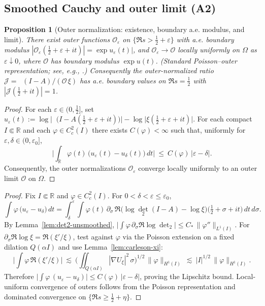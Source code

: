\documentclass[11pt]{article}
\newtheorem{proposition}[theorem]{Proposition}
\theoremstyle{definition}
\theoremstyle{remark}
\newcommand{\R}{\mathbb{R}}
\DeclareMathOperator{\dettwo}{det_2}
\begin{document}
\subsection*{Smoothed Cauchy and outer limit (A2)}
\begin{proposition}[Outer normalization: existence, boundary a.e. modulus, and limit]\label{prop:outer-central}
There exist outer functions \(\mathcal O_\varepsilon\) on \(\{\Re s>\tfrac12+\varepsilon\}\) with a.e. boundary modulus \(|\mathcal O_\varepsilon(\tfrac12+\varepsilon+it)|=\exp u_\varepsilon(t)|\), and \(\mathcal O_\varepsilon\to\mathcal O\) locally uniformly on \(\Omega\) as \(\varepsilon\downarrow 0\), where \(\mathcal O\) has boundary modulus \(\exp u(t)\). (Standard Poisson–outer representation; see, e.g., \cite{Garnett,RosenblumRovnyak}.) Consequently the outer-normalized ratio \(\mathcal J=\dettwo(I-A)/(\mathcal O\,\xi)\) has a.e. boundary values on \(\Re s=\tfrac12\) with \(|\mathcal J(\tfrac12+it)|=1\).
\end{proposition}
\begin{proof}
For each $\varepsilon\in(0,\tfrac12]$, set $u_\varepsilon(t):=\log\Big|\dettwo\!\big(I\! -\!A(\tfrac12\!+\!\varepsilon\!+\!it)\big)\Big|\! -\!\log\big|\xi(\tfrac12\!+\!\varepsilon\!+\!it)\big|$. For each compact $I\Subset\R$ and each $\varphi\in C_c^2(I)$ there exists $C(\varphi)<\infty$ such that, uniformly for $\varepsilon,\delta\in(0,\varepsilon_0]$,
\[\Big|\int_{\R} \varphi(t)\,\big(u_\varepsilon(t)-u_\delta(t)\big)\,dt\Big|\ \le\ C(\varphi)\,|\varepsilon-\delta|.\]
Consequently, the outer normalizations $\mathcal O_\varepsilon$ converge locally uniformly to an outer limit $\mathcal O$ on $\Omega$.
\end{proof}
\begin{proof}
Fix $I\Subset\R$ and $\varphi\in C_c^2(I)$. For $0<\delta<\varepsilon\le\varepsilon_0$,
\[\int \varphi\,\big(u_\varepsilon-u_\delta\big)\,dt = \int_\delta^{\varepsilon}\!\int \varphi(t)\,\partial_\sigma\,\Re\Big(\log\det_2(I-A)-\log\xi\Big)\big(\tfrac12+\sigma+it\big)\,dt\,d\sigma.\]
By Lemma~\ref{lem:det2-unsmoothed}, $\big|\int \varphi\,\partial_\sigma\Re\log\det_2\big|\le C_*\,\|\varphi''\|_{L^1(I)}$. For $\partial_\sigma\Re\log\xi=\Re(\xi'/\xi)$, test against $\varphi$ via the Poisson extension on a fixed dilation $Q(\alpha I)$ and use Lemma~\ref{lem:carleson-xi}:
\[\Big|\int \varphi\,\Re(\xi'/\xi)\Big|\ \lesssim\ \Big(\iint_{Q(\alpha I)} |\nabla U_\xi|^2\,\sigma\Big)^{1/2}\,\|\varphi\|_{H^1(I)}\ \lesssim\ |I|^{1/2}\,\|\varphi\|_{H^1(I)}.\]
Therefore $\big|\int \varphi\,(u_\varepsilon-u_\delta)\big|\le C(\varphi)\,|\varepsilon-\delta|$, proving the Lipschitz bound. Local-uniform convergence of outers follows from the Poisson representation and dominated convergence on $\{\Re s\ge\tfrac12+\eta\}$.
\end{proof}
\end{document}
